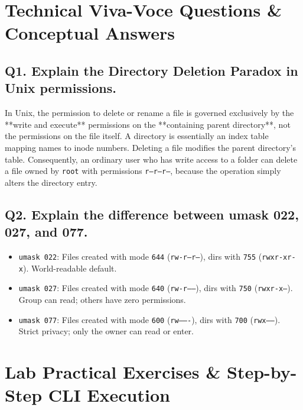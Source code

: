 \section{Technical Viva-Voce Questions \& Conceptual Answers}

\subsection*{Q1. Explain the Directory Deletion Paradox in Unix permissions.}
\begin{vivasol}
In Unix, the permission to delete or rename a file is governed exclusively by the **write and execute** permissions on the **containing parent directory**, not the permissions on the file itself. A directory is essentially an index table mapping names to inode numbers. Deleting a file modifies the parent directory's table. Consequently, an ordinary user who has write access to a folder can delete a file owned by \texttt{root} with permissions \texttt{r--r--r--}, because the operation simply alters the directory entry.
\end{vivasol}

\subsection*{Q2. Explain the difference between umask 022, 027, and 077.}
\begin{vivasol}
\begin{itemize}[leftmargin=1.5em]
    \item \texttt{umask 022}: Files created with mode \texttt{644} (\texttt{rw-r--r--}), dirs with \texttt{755} (\texttt{rwxr-xr-x}). World-readable default.
    \item \texttt{umask 027}: Files created with mode \texttt{640} (\texttt{rw-r-----}), dirs with \texttt{750} (\texttt{rwxr-x---}). Group can read; others have zero permissions.
    \item \texttt{umask 077}: Files created with mode \texttt{600} (\texttt{rw-------}), dirs with \texttt{700} (\texttt{rwx------}). Strict privacy; only the owner can read or enter.
\end{itemize}
\end{vivasol}

\section{Lab Practical Exercises \& Step-by-Step CLI Execution}

